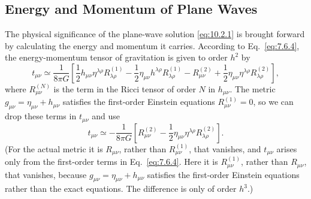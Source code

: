 
\subsection{Energy and Momentum of Plane Waves}\label{sec:10.3}

The physical significance of the plane-wave solution \eqref{eq:10.2.1} is
brought forward by calculating the energy and momentum it carries. According
to Eq.~\eqref{eq:7.6.4}, the energy-momentum tensor of gravitation is given
to order \(h^2\) by
\[
  t_{\mu\nu}\simeq\frac{1}{8\pi G}
  \left[
    \frac12h_{\mu\nu}\eta^{\lambda\rho}R^{(1)}_{\lambda\rho}
    -\frac12\eta_{\mu\nu}h^{\lambda\rho}R^{(1)}_{\lambda\rho}
    -R^{(2)}_{\mu\nu}
    +\frac12\eta_{\mu\nu}\eta^{\lambda\rho}R^{(2)}_{\lambda\rho}
  \right],
\]
where \(R^{(N)}_{\mu\nu}\) is the term in the Ricci tensor of order \(N\)
in \(h_{\mu\nu}\). The metric
\(g_{\mu\nu}=\eta_{\mu\nu}+h_{\mu\nu}\) satisfies the first-order Einstein
equations \(R^{(1)}_{\mu\nu}=0\), so we can drop these terms in
\(t_{\mu\nu}\) and use
\begin{equation}
  t_{\mu\nu}\simeq
  -\frac{1}{8\pi G}
  \left[
    R^{(2)}_{\mu\nu}
    -\frac12\eta_{\mu\nu}\eta^{\lambda\rho}R^{(2)}_{\lambda\rho}
  \right].
  \tag{10.3.1}\label{eq:10.3.1}
\end{equation}
(For the actual metric it is \(R_{\mu\nu}\), rather than
\(R^{(1)}_{\mu\nu}\), that vanishes, and \(t_{\mu\nu}\) arises only from
the first-order terms in Eq.~\eqref{eq:7.6.4}. Here it is
\(R^{(1)}_{\mu\nu}\), rather than \(R_{\mu\nu}\), that vanishes, because
\(g_{\mu\nu}=\eta_{\mu\nu}+h_{\mu\nu}\) satisfies the first-order Einstein
equations rather than the exact equations. The difference is only of order
\(h^3\).)

